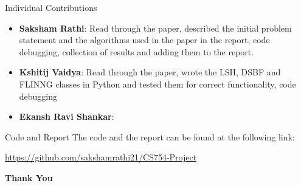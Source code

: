 \documentclass[Serif, 10pt, brown]{beamer}
\theoremstyle{example}
\theoremstyle{plain}
\begin{document}
\begin{frame}{Individual Contributions}
	\begin{itemize}
		\item \textbf{Saksham Rathi}: Read through the paper, described the initial problem statement and the algorithms used in the paper in the report, code debugging, collection of results and adding them to the report.
		\item \textbf{Kshitij Vaidya}: Read through the paper, wrote the LSH, DSBF and FLINNG classes in Python and tested them for correct functionality, code debugging
 
		\item \textbf{Ekansh Ravi Shankar}: 
	\end{itemize}
	
\end{frame}


\begin{frame}{Code and Report}
    The code and the report can be found at the following link:
    \begin{center}
        \url{https://github.com/sakshamrathi21/CS754-Project}
    \end{center}
\end{frame}

\begin{frame}
    \Huge{\centerline{\bf Thank You}}
\end{frame}
\end{document}

